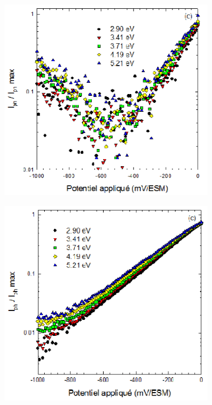     \renewcommand{\coef}{0.45}
    \begin{figure}[h]
        \centering
        \begin{subfigure}{\coef\textwidth}
            \centering
            \includegraphics[width=\textwidth]{./src/figures/Loucif2012-Fig3-18.png}
            \caption{}
            \label{fig_loucif_sctype_a}
        \end{subfigure}
        \begin{subfigure}{\coef\textwidth}
            \centering
            \includegraphics[width=\textwidth]{./src/figures/Loucif2012-Fig3-19.png}
            \caption{}
            \label{fig_loucif_sctype_b}
        \end{subfigure}
        

\end{figure}
